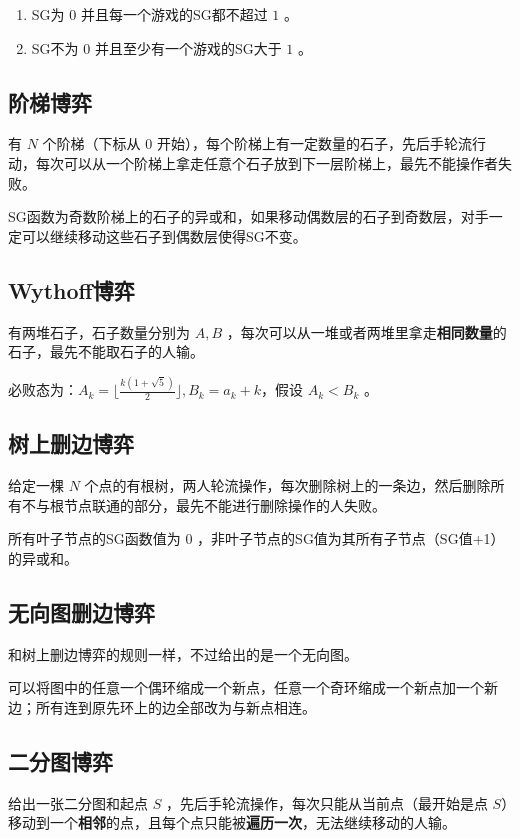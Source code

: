 \documentclass{article}
\begin{document}
\begin{enumerate}
    \item SG为 $0$ 并且每一个游戏的SG都不超过 $1$ 。
    \item SG不为 $0$ 并且至少有一个游戏的SG大于 $1$ 。
\end{enumerate}

\subsection{阶梯博弈}
有 $N$ 个阶梯（下标从 $0$ 开始），每个阶梯上有一定数量的石子，先后手轮流行动，每次可以从一个阶梯上拿走任意个石子放到下一层阶梯上，最先不能操作者失败。

SG函数为奇数阶梯上的石子的异或和，如果移动偶数层的石子到奇数层，对手一定可以继续移动这些石子到偶数层使得SG不变。

\subsection{Wythoff博弈}
有两堆石子，石子数量分别为 $A,B$ ，每次可以从一堆或者两堆里拿走\textbf{相同数量}的石子，最先不能取石子的人输。

必败态为：$A_k=\lfloor \frac{k(1+\sqrt{5})}{2}\rfloor, B_k=a_k + k$，假设 $A_k<B_k$ 。

\subsection{树上删边博弈}
给定一棵 $N$ 个点的有根树，两人轮流操作，每次删除树上的一条边，然后删除所有不与根节点联通的部分，最先不能进行删除操作的人失败。

所有叶子节点的SG函数值为 $0$ ，非叶子节点的SG值为其所有子节点（SG值+1）的异或和。

\subsection{无向图删边博弈}
和树上删边博弈的规则一样，不过给出的是一个无向图。

可以将图中的任意一个偶环缩成一个新点，任意一个奇环缩成一个新点加一个新边；所有连到原先环上的边全部改为与新点相连。

\subsection{二分图博弈}
给出一张二分图和起点 $S$ ，先后手轮流操作，每次只能从当前点（最开始是点 $S$）移动到一个\textbf{相邻}的点，且每个点只能被\textbf{遍历一次}，无法继续移动的人输。
\end{document}
